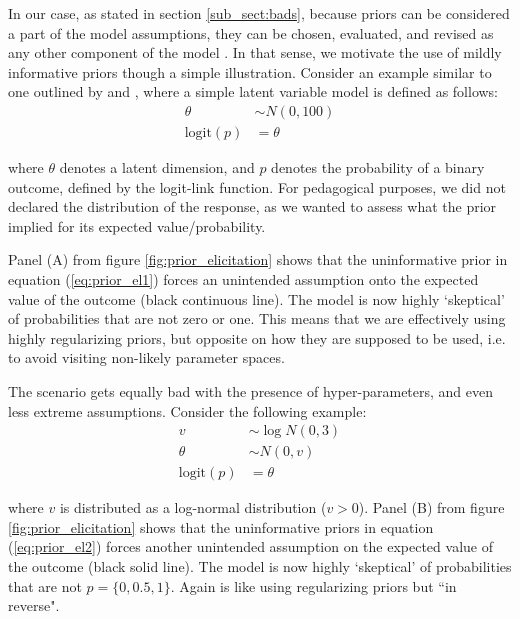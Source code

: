 In our case, as stated in section \ref{sub_sect:bads}, because priors can be considered a part of the model assumptions, they can be chosen, evaluated, and revised as any other component of the model \cite{McElreath_2020}. In that sense, we motivate the use of mildly informative priors though a simple illustration. Consider an example similar to one outlined by \citet{Seaman_et_al_2012} and \citet{McElreath_2020}, where a simple latent variable model is defined as follows:
%
\begin{equation} \label{eq:prior_el1}
	\begin{split}	
		\theta &\sim N(0, 100) \\
		\text{logit}(p) &= \theta
	\end{split}
\end{equation}

\noindent where $\theta$ denotes a latent dimension, and $p$ denotes the probability of a binary outcome, defined by the logit-link function. For pedagogical purposes, we did not declared the distribution of the response, as we wanted to assess what the prior implied for its expected value/probability.

Panel (A) from figure \ref{fig:prior_elicitation} shows that the uninformative prior in equation (\ref{eq:prior_el1}) forces an unintended assumption onto the expected value of the outcome (black continuous line). The model is now highly `skeptical' of probabilities that are not zero or one. This means that we are effectively using highly regularizing priors, but opposite on how they are supposed to be used, i.e. to avoid visiting non-likely parameter spaces.

The scenario gets equally bad with the presence of hyper-parameters, and even less extreme assumptions. Consider the following example:
%
\begin{equation} \label{eq:prior_el2}
	\begin{split}
		v &\sim \log N(0, 3) \\	
		\theta &\sim N(0, v) \\
		\text{logit}(p) &= \theta
	\end{split}
\end{equation}

\noindent where $v$ is distributed as a log-normal distribution ($v>0$). Panel (B) from figure \ref{fig:prior_elicitation} shows that the uninformative priors in equation (\ref{eq:prior_el2}) forces another unintended assumption on the expected value of the outcome (black solid line). The model is now highly `skeptical' of probabilities that are not $p = \{0, 0.5, 1\}$. Again is like using regularizing priors but ``in reverse".

